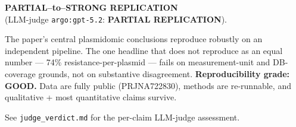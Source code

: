 \documentclass[11pt]{article}
\begin{document}
\noindent\textbf{PARTIAL--to--STRONG REPLICATION} \\
(LLM-judge \texttt{argo:gpt-5.2}: \textbf{PARTIAL REPLICATION}).

The paper's central plasmidomic conclusions reproduce robustly on an
independent pipeline. The one headline that does not reproduce as an
equal number --- 74\% resistance-per-plasmid --- fails on
measurement-unit and DB-coverage grounds, not on substantive
disagreement. \textbf{Reproducibility grade: GOOD.} Data are fully public
(PRJNA722830), methods are re-runnable, and qualitative + most
quantitative claims survive.

See \texttt{judge\_verdict.md} for the per-claim LLM-judge assessment.
\end{document}

